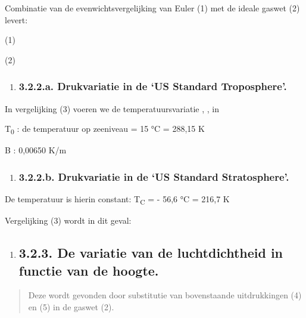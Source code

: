 \documentclass[]{article}
\begin{document}
Combinatie van de evenwichtsvergelijking van Euler (1) met de ideale
gaswet (2) levert:

(1)

(2)

\begin{enumerate}
\item
  \subsubsection{3.2.2.a. Drukvariatie in de `US Standard
  Troposphere'.}\label{a.-drukvariatie-in-de-us-standard-troposphere.}
\end{enumerate}

In vergelijking (3) voeren we de temperatuursvariatie , , in

T\textsubscript{0} : de temperatuur op zeeniveau = 15 °C = 288,15 K

B : 0,00650 K/m

\begin{enumerate}
\item
  \subsubsection{3.2.2.b. Drukvariatie in de `US Standard
  Stratosphere'.}\label{b.-drukvariatie-in-de-us-standard-stratosphere.}
\end{enumerate}

De temperatuur is hierin constant: T\textsubscript{C} = - 56,6 °C =
216,7 K

Vergelijking (3) wordt in dit geval:

\begin{enumerate}
\item
  \subsection{3.2.3. De variatie van de luchtdichtheid in functie van de
  hoogte.}\label{de-variatie-van-de-luchtdichtheid-in-functie-van-de-hoogte.}
\end{enumerate}

\begin{quote}
Deze wordt gevonden door substitutie van bovenstaande uitdrukkingen (4)
en (5) in de gaswet (2).
\end{quote}
\end{document}
